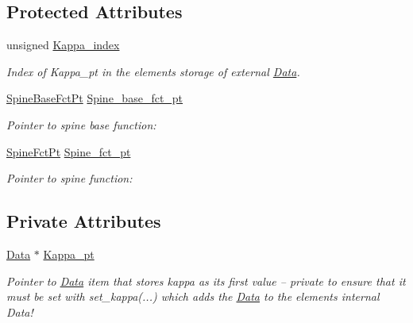 \subsection*{Protected Attributes}
\begin{DoxyCompactItemize}
\item 
unsigned \hyperlink{classoomph_1_1YoungLaplaceEquations_ab64b10fcc80fe799f20c2dd04c8cef81}{Kappa\+\_\+index}
\begin{DoxyCompactList}\small\item\em Index of Kappa\+\_\+pt in the element\textquotesingle{}s storage of external \hyperlink{classoomph_1_1Data}{Data}. \end{DoxyCompactList}\item 
\hyperlink{classoomph_1_1YoungLaplaceEquations_a5e09288f5d3b710f23e8e57401a48ccc}{Spine\+Base\+Fct\+Pt} \hyperlink{classoomph_1_1YoungLaplaceEquations_af40879c321f957ff4fb450abcb61a78f}{Spine\+\_\+base\+\_\+fct\+\_\+pt}
\begin{DoxyCompactList}\small\item\em Pointer to spine base function\+: \end{DoxyCompactList}\item 
\hyperlink{classoomph_1_1YoungLaplaceEquations_a97448cfb2f6361e986d363d9e4463f9f}{Spine\+Fct\+Pt} \hyperlink{classoomph_1_1YoungLaplaceEquations_aceae254105250eef19e75751fdbf45b9}{Spine\+\_\+fct\+\_\+pt}
\begin{DoxyCompactList}\small\item\em Pointer to spine function\+: \end{DoxyCompactList}\end{DoxyCompactItemize}
\subsection*{Private Attributes}
\begin{DoxyCompactItemize}
\item 
\hyperlink{classoomph_1_1Data}{Data} $\ast$ \hyperlink{classoomph_1_1YoungLaplaceEquations_ac7e5591f67c7355051b246043a0d7dc2}{Kappa\+\_\+pt}
\begin{DoxyCompactList}\small\item\em Pointer to \hyperlink{classoomph_1_1Data}{Data} item that stores kappa as its first value -- private to ensure that it must be set with set\+\_\+kappa(...) which adds the \hyperlink{classoomph_1_1Data}{Data} to the element\textquotesingle{}s internal Data! \end{DoxyCompactList}\end{DoxyCompactItemize}
